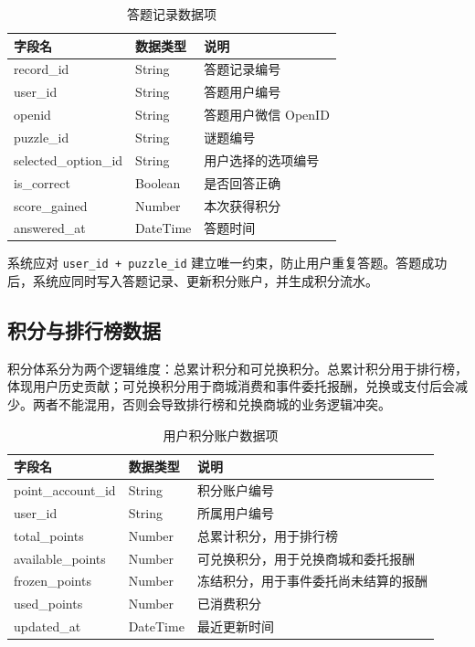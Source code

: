 \documentclass[a4paper,12pt]{article}
\begin{document}
\begin{longtable}{p{3.5cm}p{3cm}p{7cm}}
\caption{答题记录数据项} \\
\toprule
字段名 & 数据类型 & 说明 \\
\midrule
record\_id & String & 答题记录编号 \\
user\_id & String & 答题用户编号 \\
openid & String & 答题用户微信 OpenID \\
puzzle\_id & String & 谜题编号 \\
selected\_option\_id & String & 用户选择的选项编号 \\
is\_correct & Boolean & 是否回答正确 \\
score\_gained & Number & 本次获得积分 \\
answered\_at & DateTime & 答题时间 \\
\bottomrule
\end{longtable}

系统应对 \texttt{user\_id + puzzle\_id} 建立唯一约束，防止用户重复答题。答题成功后，系统应同时写入答题记录、更新积分账户，并生成积分流水。

\subsection{积分与排行榜数据}

积分体系分为两个逻辑维度：总累计积分和可兑换积分。总累计积分用于排行榜，体现用户历史贡献；可兑换积分用于商城消费和事件委托报酬，兑换或支付后会减少。两者不能混用，否则会导致排行榜和兑换商城的业务逻辑冲突。

\begin{longtable}{p{3.5cm}p{3cm}p{7cm}}
\caption{用户积分账户数据项} \\
\toprule
字段名 & 数据类型 & 说明 \\
\midrule
point\_account\_id & String & 积分账户编号 \\
user\_id & String & 所属用户编号 \\
total\_points & Number & 总累计积分，用于排行榜 \\
available\_points & Number & 可兑换积分，用于兑换商城和委托报酬 \\
frozen\_points & Number & 冻结积分，用于事件委托尚未结算的报酬 \\
used\_points & Number & 已消费积分 \\
updated\_at & DateTime & 最近更新时间 \\
\bottomrule
\end{longtable}
\end{document}
